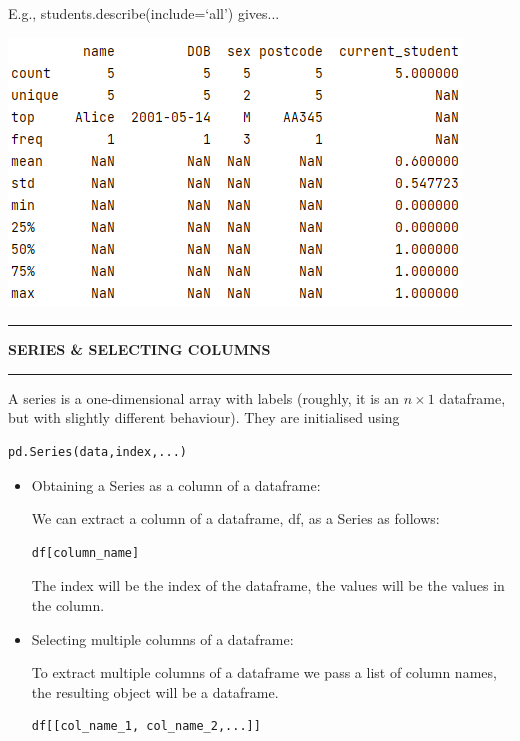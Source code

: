 \documentclass[8pt]{extarticle}
\newcommand{\heading}[1]{%
    \noindent
    \rule{\linewidth}{0.4pt}
    \begin{center}
        \vspace{-1ex}
        \textbf{#1}        
        \vspace{-2.5ex}
    \end{center}
    \rule{\linewidth}{0.4pt}
}
\begin{document}
\begin{multicols}{4}
E.g., students.describe(include=`all') gives...
\begin{center}
\includegraphics[scale = 0.5]{images/describe()_method.png}
\end{center}
\vspace{1ex}

\heading{SERIES \& SELECTING COLUMNS}

A series is a one-dimensional array with labels (roughly, it is an $n \times 1$ dataframe, but with slightly different behaviour). They are initialised using 

\begin{lstlisting}[style=Python]
pd.Series(data,index,...)
\end{lstlisting}

\begin{itemize}
\item Obtaining a Series as a column of a dataframe:

We can extract a column of a dataframe, df, as a Series as follows:
\begin{lstlisting}[style=Python]
df[column_name]
\end{lstlisting}
The index will be the index of the dataframe, the values will be the values in the column.

\item Selecting multiple columns of a dataframe:

To extract multiple columns of a dataframe we pass a list of column names, the resulting object will be a dataframe. 

\begin{lstlisting}[style=Python]
df[[col_name_1, col_name_2,...]]
\end{lstlisting}
\end{itemize}

\end{multicols}
\newpage
\thispagestyle{empty} 
\end{document}

